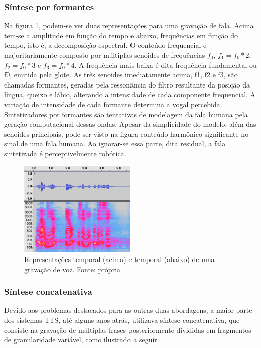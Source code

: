 \subsubsection{Síntese por formantes}
\label{formant}
Na figura \ref{fig:spectrum}, podem-se ver duas representações para uma gravação de
fala. Acima tem-se a amplitude em função do tempo e abaixo, frequências em
função do tempo, isto é, a decomposição espectral. O conteúdo frequencial é
majoritariamente composto por múltiplas senoides de frequências $ f_0 $, $ f_1 =
f_0 * 2 $, $ f_2 = f_0 * 3 $ e $ f_3 = f_0 * 4 $. A frequência mais baixa é dita
frequência fundamental ou f0, emitida pela glote. As três senoides imediatamente
acima, f1, f2 e f3, são chamadas formantes, geradas pela ressonância do filtro
resultante da posição da língua, queixo e lábio, alterando a intensidade de cada
componente frequencial. A variação de intensidade de cada formante determina a
vogal percebida. Sintetizadores por formantes são tentativas de modelagem da
fala humana pela geração computacional dessas ondas. Apesar da simplicidade do
modelo, além das senoides principais, pode ser visto na figura conteúdo
harmônico significante no sinal de uma fala humana. Ao ignorar-se essa parte,
dita residual, a fala sintetizada é perceptivelmente robótica.


\begin{figure}
  \centering
    \includegraphics[width=0.5\textwidth]{Imagens/espectro.png}
  \caption{Representações temporal (acima) e temporal (abaixo) de uma gravação de voz. Fonte: própria}
  \label{fig:spectrum}
\end{figure}


\subsubsection{Síntese concatenativa}
Devido aos problemas destacados para as outras duas abordagens, a maior parte
dos sistemas TTS, até alguns anos atrás, utilizava síntese concatenativa, que
consiste na gravação de múltiplas frases posteriormente divididas
em fragmentos de granularidade variável, como ilustrado a seguir.

